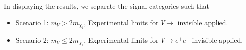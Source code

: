 In displaying the results, we separate the signal categories such that
\begin{itemize}
\item Scenario 1: $m_V > 2 m_{\chi_1}$, Experimental limits for $V \to$ invisible  applied.
\item Scenario 2: $m_V \le 2 m_{\chi_1}$, Experimental limits for $V \to e^+ e^-$ invisible  applied.
\end{itemize}

